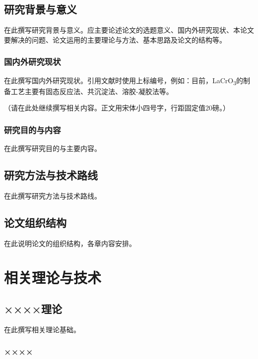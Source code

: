 \documentclass[12pt, a4paper, openany]{ctexbook}
\begin{document}
\section{研究背景与意义}

在此撰写研究背景与意义。应主要论述论文的选题意义、国内外研究现状、本论文要解决的问题、论文运用的主要理论与方法、基本思路及论文的结构等。

\subsection{国内外研究现状}

在此撰写国内外研究现状。引用文献时使用上标编号，例如：目前，LaCrO\textsubscript{3}的制备工艺主要有固态反应法\cite{ref1}、共沉淀法\cite{ref2}、溶胶-凝胶法\cite{ref3}等。

（请在此处继续撰写相关内容。正文用宋体小四号字，行距固定值20磅。）

\subsection{研究目的与内容}

在此撰写研究目的与主要内容。

\section{研究方法与技术路线}

在此撰写研究方法与技术路线。

\section{论文组织结构}

在此说明论文的组织结构，各章内容安排。

\chapter{相关理论与技术}

\section{××××理论}

在此撰写相关理论基础。

\subsection{××××}
\end{document}

